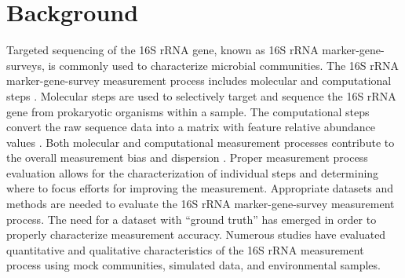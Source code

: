 \documentclass[linenumbers]{bmcart}
\begin{document}
\begin{frontmatter}
\begin{abstractbox}
\begin{keyword}
\end{keyword}


\end{abstractbox}
%

\end{frontmatter}



\section*{Background}

Targeted sequencing of the 16S rRNA gene, known as 16S rRNA
marker-gene-surveys, is commonly used to characterize
microbial communities. The 16S rRNA marker-gene-survey
measurement process includes molecular and
computational steps \cite{Goodrich2014}.
Molecular steps are used to selectively target and sequence the 16S rRNA
gene from prokaryotic organisms within a sample. The computational steps
convert the raw sequence data into a matrix with feature relative abundance values
\cite{Goodrich2014}. Both molecular and computational measurement
processes contribute to the overall measurement bias and dispersion
\cite{Amore2016, Goodrich2014, brooks2015truth}. Proper measurement
process evaluation allows for the characterization of individual
steps and determining where to focus efforts for improving the measurement. Appropriate
datasets and methods are needed to evaluate the 16S rRNA
marker-gene-survey measurement process. The need for a  dataset with
``ground truth'' has emerged in order to properly characterize measurement accuracy.
Numerous studies have evaluated quantitative and qualitative
characteristics of the 16S rRNA measurement process using mock
communities, simulated data, and environmental samples.
\end{document}
